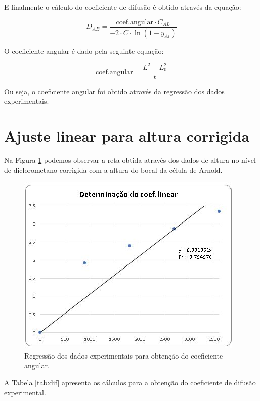 E finalmente o cálculo do coeficiente de difusão é obtido através da equação:


\begin{equation}\label{key}
D_{A B}=\frac{\text {coef.angular} \cdot C_{A L}}{-2 \cdot C \cdot \ln \left(1-y_{A i}\right)}
\end{equation}

O coeficiente angular é dado pela seguinte equação:

\begin{equation}\label{key}
\text {coef.angular}=\frac{L^{2}-L_{0}^{2}}{t}
\end{equation}

Ou seja, o coeficiente angular foi obtido através da regressão dos dados experimentais.


\section{Ajuste linear para altura corrigida}


Na Figura \ref{linear} podemos observar a reta obtida através dos dados de altura no nível de diclorometano corrigida com a altura do bocal da célula de Arnold.

\begin{figure}[H]
	\begin{center}
		\includegraphics[scale=1,trim={0 0 0 0}]{figuras/ladeq/difusao/linear00}
		\caption{Regressão dos dados experimentais para obtenção do coeficiente angular.}
		\label{linear}
	\end{center}
\end{figure}

A Tabela \ref{tab:dif} apresenta os cálculos para a obtenção do coeficiente de difusão experimental.



